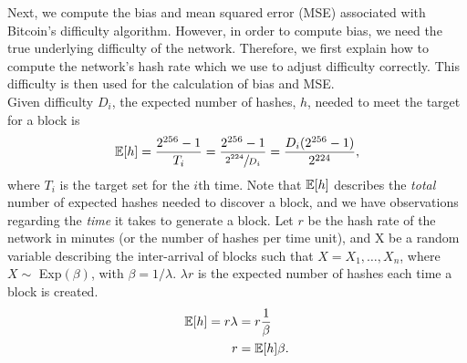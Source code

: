 Next, we compute the bias and mean squared error (MSE) associated with Bitcoin's difficulty algorithm. However, in order to compute bias, we need the true underlying difficulty of the network. Therefore, we first explain how to compute the network's hash rate which we use to adjust difficulty correctly. This difficulty is then used for the calculation of bias and MSE. \\
Given difficulty $D_i$, the expected number of hashes, $h$, needed to meet the target for a block is
\begin{align}
\operatorname{\mathbb{E}}[h] =  \frac{2^{256}-1}{T_i} = \frac{2^{256}-1}{\sfrac{2^{224}}{D_i}} = \frac{D_i(2^{256}-1)}{2^{224}}, 
\end{align}
where $T_i$ is the target set for the $i$th time. Note that $\operatorname{\mathbb{E}}[h]$ describes the \textit{total} number of expected hashes needed to discover a block, and we have observations regarding the \textit{time} it takes to generate a block. Let $r$ be the hash rate of the network in minutes (or the number of hashes per time unit), and X be a random variable describing the inter-arrival of blocks such that $X = X_1, \dots, X_{n}$, where $X \sim$ Exp$(\beta)$, with $\beta = 1/\lambda$. $\lambda r$ is the expected number of hashes each time a block is created.  %
\begin{align}
\operatorname{\mathbb{E}}[h] = r \lambda &= r \frac{1}{\beta}  \\
r &= \operatorname{\mathbb{E}}[h] \beta.
\end{align}

